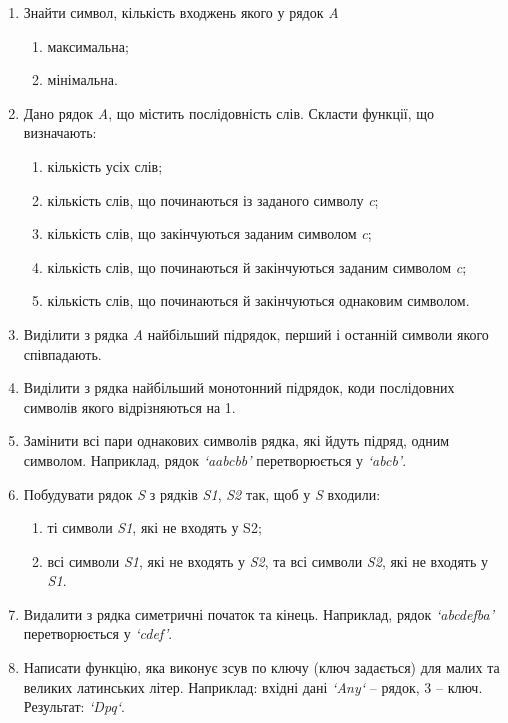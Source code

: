 \documentclass[]{article}
\makeatletter
\newcommand{\xslalph}[1]{\expandafter\@xslalph\csname c@#1\endcsname}
\newcommand{\@xslalph}[1]{%
    \ifcase#1\or а\or б\or в\or г\or д\or e\or є\or ж\or з\or i%
    \or й\or к\or л\or м\or н\or о\or п\or р\or с\or т%
    \or у\or ф\or х\or ц\or ч\or ш\or ю\or я\or аа\or бб\or вв %
    \else\@ctrerr\fi%
}
\makeatother
\begin{document}
\begin{enumerate}
\item
  Знайти символ, кількість входжень якого у рядок \emph{A}
\begin{enumerate}[label=\xslalph*)]
  \item максимальна;
  \item мінімальна.
\end{enumerate}
\item
Дано рядок \emph{A}, що містить послідовність слів. Скласти функції, що визначають:
\begin{enumerate}[label=\xslalph*)]
\item кількість усіх слів;
\item кількість слів, що починаються із заданого символу \emph{c};
\item кількість слів, що закінчуються заданим символом \emph{c};
\item кількість слів, що починаються й закінчуються заданим символом \emph{c};
\item кількість слів, що починаються й закінчуються однаковим символом.
\end{enumerate}

\item 
  Виділити з рядка \emph{A} найбільший підрядок, перший і останній
  символи якого співпадають.
\item
  Виділити з рядка найбільший монотонний підрядок, коди послідовних
  символів якого відрізняються на 1.
\item
  Замінити всі пари однакових символів рядка, які йдуть підряд, одним
  символом. Наприклад, рядок \emph{`aabcbb'} перетворюється у
  \emph{`abcb'}.
\item
  Побудувати рядок \emph{S} з рядків \emph{S1}, \emph{S2} так, щоб у
  \emph{S} входили:
\begin{enumerate}[label=\xslalph*)]
\item ті символи \emph{S1}, які не входять у S2;
\item всі символи \emph{S1}, які не входять у \emph{S2}, та всі символи
\emph{S2}, які не входять у \emph{S1}.
\end{enumerate}

\item
Видалити з рядка симетричні початок та кінець. Наприклад, рядок
\emph{`abcdefba'} перетворюється у \emph{`cdef'}. 

\item
Написати функцію, яка виконує зсув по ключу (ключ задається) для малих 
та великих латинських літер. Наприклад: вхідні дані \emph{`Any`} -- рядок, 3 -- ключ.
Результат: \emph{`Dpq`}.


\end{enumerate}
\end{document}
